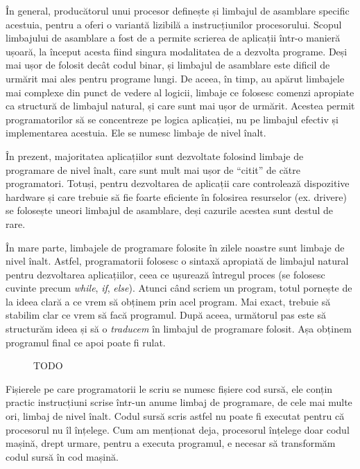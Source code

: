 În general, producătorul unui procesor definește și limbajul de asamblare
specific acestuia, pentru a oferi o variantă lizibilă a instrucțiunilor
procesorului. Scopul limbajului de asamblare a fost de a permite scrierea de
aplicații într-o manieră ușoară, la început acesta fiind singura modalitatea de
a dezvolta programe. Deși mai ușor de folosit decât codul binar, și limbajul de
asamblare este dificil de urmărit mai ales pentru programe lungi. De aceea, în
timp, au apărut limbajele mai complexe din punct de vedere al logicii, limbaje
ce folosesc comenzi apropiate ca structură de limbajul natural, și care sunt mai
ușor de urmărit. Acestea permit programatorilor să se concentreze pe logica
aplicației, nu pe limbajul efectiv și implementarea acestuia. Ele se numesc
limbaje de nivel înalt.

În prezent, majoritatea aplicațiilor sunt dezvoltate folosind limbaje de
programare de nivel înalt, care sunt mult mai ușor de “citit” de către
programatori. Totuși, pentru dezvoltarea de aplicații care controlează
dispozitive hardware și care trebuie să fie foarte eficiente în folosirea
resurselor (ex. drivere) se folosește uneori limbajul de asamblare, deși
cazurile acestea sunt destul de rare.

În mare parte, limbajele de programare folosite în zilele noastre sunt limbaje
de nivel înalt. Astfel, programatorii folosesc o sintaxă apropiată de limbajul
natural pentru dezvoltarea aplicațiilor, ceea ce ușurează întregul proces (se
folosesc cuvinte precum \textit{while}, \textit{if}, \textit{else}). Atunci
când scriem un program, totul pornește de la ideea clară a ce vrem să obținem
prin acel program. Mai exact, trebuie să stabilim clar ce vrem să facă
programul. După aceea, următorul pas este să structurăm ideea și să o
\textit{traducem} în limbajul de programare folosit. Așa obținem programul final
ce apoi poate fi rulat.

\begin{figure}[htbp]
	\centering
	\def\svgwidth{\columnwidth}
	
	\caption{TODO}
\end{figure}

Fișierele pe care programatorii le scriu se numesc fișiere cod sursă, ele conțin
practic instrucțiuni scrise într-un anume limbaj de programare, de cele mai
multe ori, limbaj de nivel înalt. Codul sursă scris astfel nu poate fi executat
pentru că procesorul nu îl înțelege. Cum am menționat deja, procesorul înțelege
doar codul mașină, drept urmare, pentru a executa programul, e necesar să
transformăm codul sursă în cod mașină.

